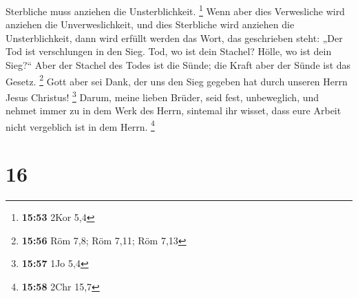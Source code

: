 Sterbliche muss anziehen die Unsterblichkeit. \footnote{\textbf{15:53}
  2Kor 5,4}  Wenn aber dies Verwesliche wird anziehen die
Unverweslichkeit, und dies Sterbliche wird anziehen die Unsterblichkeit,
dann wird erfüllt werden das Wort, das geschrieben steht:
 „Der Tod ist verschlungen in den Sieg. Tod, wo ist dein
Stachel? Hölle, wo ist dein Sieg?{}``  Aber der Stachel
des Todes ist die Sünde; die Kraft aber der Sünde ist das Gesetz.
\footnote{\textbf{15:56} Röm 7,8; Röm 7,11; Röm 7,13} 
Gott aber sei Dank, der uns den Sieg gegeben hat durch unseren Herrn
Jesus Christus! \footnote{\textbf{15:57} 1Jo 5,4}  Darum,
meine lieben Brüder, seid fest, unbeweglich, und nehmet immer zu in dem
Werk des Herrn, sintemal ihr wisset, dass eure Arbeit nicht vergeblich
ist in dem Herrn. \footnote{\textbf{15:58} 2Chr 15,7}

\hypertarget{section-15}{%
\section{16}\label{section-15}}

